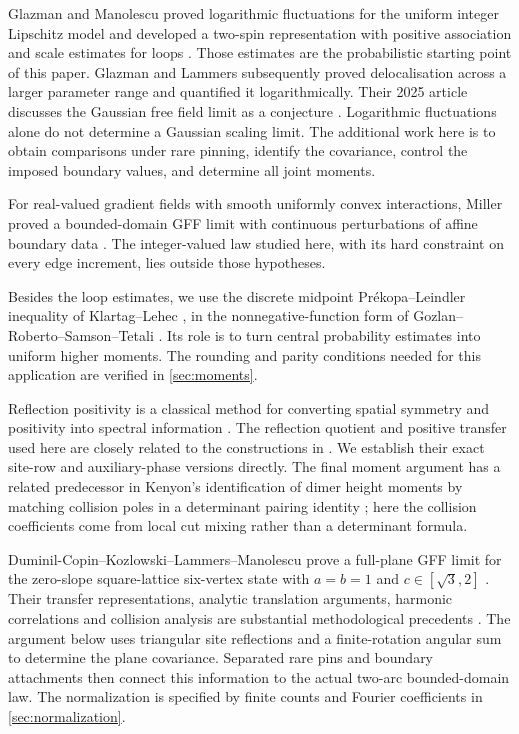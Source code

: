 Glazman and Manolescu proved logarithmic fluctuations for the uniform
integer Lipschitz model and developed a two-spin representation with
positive association and scale estimates for loops \cite{GM2021}.  Those
estimates are the probabilistic starting point of this paper.  Glazman and
Lammers subsequently proved delocalisation across a larger parameter range
and quantified it logarithmically.  Their 2025 article discusses the
Gaussian free field limit as a conjecture \cite[Section~1.2.4]{GL2025}.
Logarithmic fluctuations alone do not determine a Gaussian scaling limit.
The additional work here is to obtain comparisons under rare pinning,
identify the covariance, control the imposed boundary values, and determine
all joint moments.

For real-valued gradient fields with smooth uniformly convex interactions,
Miller proved a bounded-domain GFF limit with continuous perturbations of
affine boundary data \cite[Theorem~1.1]{Miller2011}.  The integer-valued law
studied here, with its hard constraint on every edge increment, lies outside
those hypotheses.

Besides the loop estimates, we use the discrete midpoint
Pr\'ekopa--Leindler inequality of Klartag--Lehec
\cite[Theorem~1.4]{KlartagLehec2019}, in the nonnegative-function form of
Gozlan--Roberto--Samson--Tetali \cite[Theorem~3]{GRST2019}.  Its role is to
turn central probability estimates into uniform higher moments.  The
rounding and parity conditions needed for this application are verified
in \cref{sec:moments}.

Reflection positivity is a classical method for converting spatial
symmetry and positivity into spectral information
\cite{FILS1978}.  The reflection quotient and positive transfer used here
are closely related to the constructions in
\cite[Sections~3.1--3.3 and 4.1]{Usui2012}.  We establish their exact
site-row and auxiliary-phase versions directly.  The final moment
argument has a related predecessor in Kenyon's identification of dimer
height moments by matching collision poles in a determinant pairing identity
\cite[Lemma~3.1 and Proposition~3.2]{Kenyon2001}; here the collision
coefficients come from local cut mixing rather than a determinant formula.

Duminil-Copin--Kozlowski--Lammers--Manolescu prove a full-plane GFF limit
for the zero-slope square-lattice six-vertex state with
$a=b=1$ and $c\in[\sqrt3,2]$
\cite[Theorems~2.2 and 2.8]{DCKLM2026}.  Their transfer representations,
analytic translation arguments, harmonic correlations and collision
analysis are substantial methodological precedents
\cite[Theorems~4.12 and 4.15; Sections~7--9]{DCKLM2026}.
The argument below uses triangular site reflections and a finite-rotation
angular sum to determine the plane covariance.  Separated rare pins and
boundary attachments then connect this information to the actual
two-arc bounded-domain law.  The normalization is specified by finite
counts and Fourier coefficients in \cref{sec:normalization}.

